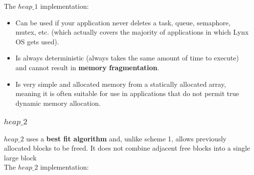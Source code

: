 \documentclass[12pt]{article}
\begin{document}
The $heap\_1$ implementation:

\begin{itemize}
	\item Can be used if your application never deletes a task, queue, semaphore, mutex, etc. (which actually covers the majority of applications in which Lynx OS gets used).
	
	
	\item Is always deterministic (always takes the same amount of time to execute) and cannot result in \textbf{memory fragmentation}.
		
	\item Is very simple and allocated memory from a statically allocated array, meaning it is often suitable for use in applications that do not permit true dynamic memory allocation.

\end{itemize}	

\subsubsection{$heap\_2$}	

$heap\_2$ uses a \textbf{best fit algorithm} and, unlike scheme 1, allows previously allocated blocks to be freed. It does not combine adjacent free blocks into a single large block\\

The $heap\_2$ implementation:
\end{document}
